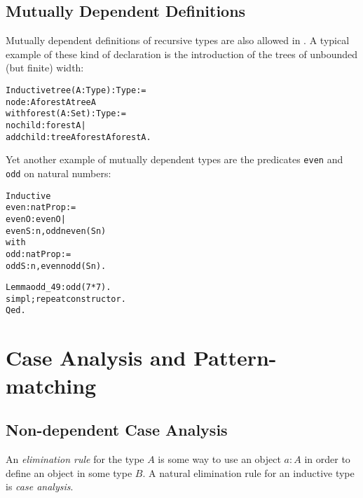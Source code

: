 \documentclass[11pt]{article}
\begin{document}


\subsection{Mutually Dependent Definitions}
\label{MutuallyDependent}

Mutually dependent definitions of recursive types are also allowed in
{\coq}.  A typical example of these kind of declaration is the
introduction of the trees of unbounded (but finite) width:
\label{Forest}
\begin{alltt} 
Inductive tree(A:Type)   : Type :=
    node : A {\arrow} forest A \arrow{} tree A 
with  forest (A: Set)   : Type := 
    nochild  : forest A |
    addchild : tree A \arrow{} forest A \arrow{} forest A.
\end{alltt}
\noindent  Yet another example of mutually dependent types are the
predicates \texttt{even} and \texttt{odd} on natural numbers:
\label{Even}
\begin{alltt} 
Inductive 
  even    : nat\arrow{}Prop :=
    evenO : even  O |
    evenS : {\prodsym} n, odd n \arrow{} even (S n)
with
  odd    : nat\arrow{}Prop :=
    oddS : {\prodsym} n, even n \arrow{} odd (S n).
\end{alltt}

\begin{alltt}
Lemma odd_49 : odd (7 * 7).
 simpl; repeat constructor.
Qed.
\end{alltt}



\section{Case Analysis and Pattern-matching}
\label{CaseAnalysis}
\subsection{Non-dependent Case Analysis}
An \textsl{elimination rule} for the type $A$ is some way to use an
object $a:A$ in order to define an object in some  type $B$. 
A natural elimination rule for an inductive type is \emph{case analysis}.
\end{document}
